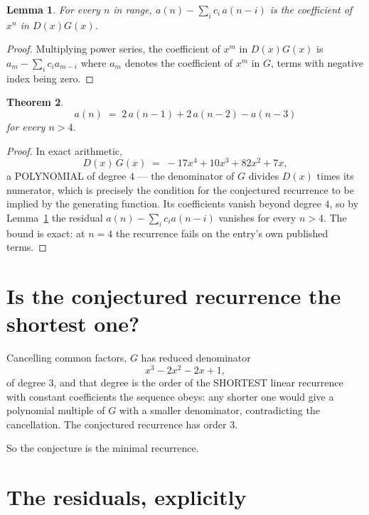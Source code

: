 \documentclass[11pt,a4paper]{article}
\theoremstyle{plain}
\newtheorem{theorem}{Theorem}
\newtheorem{lemma}[theorem]{Lemma}
\theoremstyle{definition}
\begin{document}
\begin{lemma}\label{lem:key}
For every $n$ in range, $a(n)-\sum_i c_i\,a(n-i)$ is the coefficient of $x^{n}$ in
$D(x)G(x)$.
\end{lemma}

\begin{proof}
Multiplying power series, the coefficient of $x^{m}$ in $D(x)G(x)$ is
$a_m-\sum_i c_i a_{m-i}$ where $a_m$ denotes the coefficient of $x^{m}$ in $G$, terms with
negative index being zero.
\end{proof}

\begin{theorem}
\[
a(n)\;=\;2\,a(n-1) + 2\,a(n-2) - a(n-3)
\]
for every $n>4$.
\end{theorem}

\begin{proof}
In exact arithmetic,
\[
D(x)\,G(x)\;=\;- 17 x^{4} + 10 x^{3} + 82 x^{2} + 7 x,
\]
a POLYNOMIAL of degree $4$ --- the denominator of $G$ divides $D(x)$ times its numerator,
which is precisely the condition for the conjectured recurrence to be implied by the
generating function. Its coefficients vanish beyond degree $4$, so by
Lemma~\ref{lem:key} the residual $a(n)-\sum_ic_ia(n-i)$ vanishes for every
$n>4$. The bound is exact: at $n=4$ the recurrence fails on the entry's own published terms.
\end{proof}

\section{Is the conjectured recurrence the shortest one?}

Cancelling common factors, $G$ has reduced denominator
\[
x^{3} - 2 x^{2} - 2 x + 1,
\]
of degree $3$, and that degree is the order of the SHORTEST linear recurrence with
constant coefficients the sequence obeys: any shorter one would give a polynomial multiple of
$G$ with a smaller denominator, contradicting the cancellation. The conjectured recurrence has
order $3$.

So the conjecture is the minimal recurrence.

\section{The residuals, explicitly}
\end{document}
